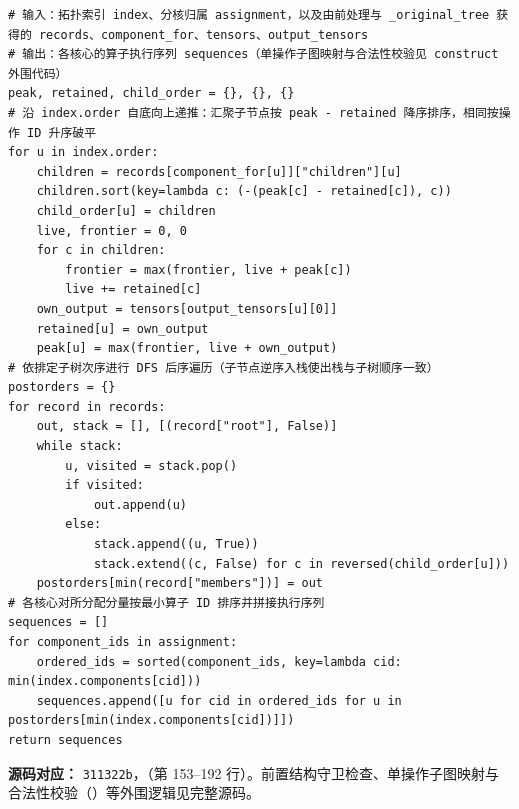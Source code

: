 \documentclass[anonymous,withtoc]{gmcm2026}
\renewcommand{\thealgorithm}{\thesection-\arabic{algorithm}}
\begin{document}
\par{}\begingroup\normalsize
\captionsetup{type=algorithm,position=top,justification=raggedright,singlelinecheck=false,labelfont=bf}
\label{alg:p3-forest-memory-order}
\nopagebreak
\begin{tcolorbox}[enhanced,breakable,colback=white,colframe=black,
  boxrule=0pt,toprule=.4pt,bottomrule=.4pt,sharp corners,boxsep=0pt,
  left=0pt,right=0pt,top=4pt,bottom=4pt,before skip=2pt,after skip=2pt,
  title after break={算法~\thealgorithm（续）},
  colbacktitle=white,coltitle=black,fonttitle=\normalsize\bfseries]


\begin{lstlisting}[style=paperpseudo]
# 输入：拓扑索引 index、分核归属 assignment，以及由前处理与 _original_tree 获得的 records、component_for、tensors、output_tensors
# 输出：各核心的算子执行序列 sequences（单操作子图映射与合法性校验见 construct 外围代码）
peak, retained, child_order = {}, {}, {}
# 沿 index.order 自底向上递推：汇聚子节点按 peak - retained 降序排序，相同按操作 ID 升序破平
for u in index.order:
    children = records[component_for[u]]["children"][u]
    children.sort(key=lambda c: (-(peak[c] - retained[c]), c))
    child_order[u] = children
    live, frontier = 0, 0
    for c in children:
        frontier = max(frontier, live + peak[c])
        live += retained[c]
    own_output = tensors[output_tensors[u][0]]
    retained[u] = own_output
    peak[u] = max(frontier, live + own_output)
# 依排定子树次序进行 DFS 后序遍历（子节点逆序入栈使出栈与子树顺序一致）
postorders = {}
for record in records:
    out, stack = [], [(record["root"], False)]
    while stack:
        u, visited = stack.pop()
        if visited:
            out.append(u)
        else:
            stack.append((u, True))
            stack.extend((c, False) for c in reversed(child_order[u]))
    postorders[min(record["members"])] = out
# 各核心对所分配分量按最小算子 ID 排序并拼接执行序列
sequences = []
for component_ids in assignment:
    ordered_ids = sorted(component_ids, key=lambda cid: min(index.components[cid]))
    sequences.append([u for cid in ordered_ids for u in postorders[min(index.components[cid])]])
return sequences
\end{lstlisting}
\textbf{源码对应：} \texttt{311322b}，\texttt{}（第 153--192 行）。前置结构守卫检查、单操作子图映射与合法性校验（\texttt{}）等外围逻辑见完整源码。

\end{tcolorbox}\endgroup
\end{document}
